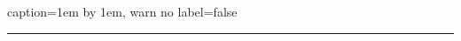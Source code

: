 \documentclass{article}
\begin{document}

	\begin{figureobject}{caption=1em by 1em, warn no label=false}
		\rule{1em}{1em}
	\end{figureobject}
\end{document}

